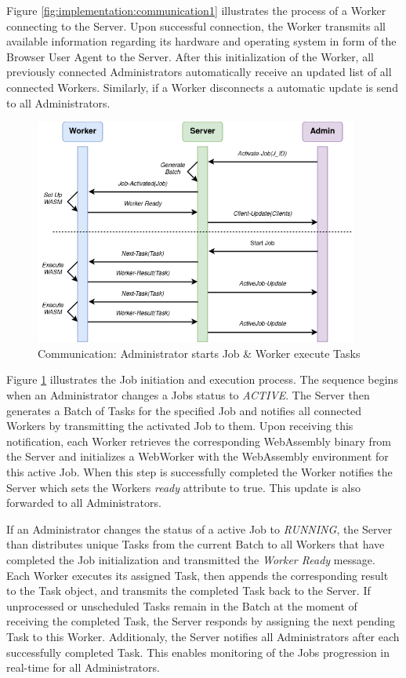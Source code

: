 Figure \ref{fig:implementation:communication1} illustrates the process of a Worker connecting to the Server. Upon successful connection, the Worker transmits all available information regarding its hardware and operating system in form of the Browser User Agent to the Server. After this initialization of the Worker, all previously connected Administrators automatically receive an updated list of all connected Workers. Similarly, if a Worker disconnects a automatic update is send to all Administrators.

\begin{figure}[htbp]
    \centering
    \includegraphics[width=0.95\textwidth]{gfx/figures/communication-jobexecution.png}
    \caption{Communication: Administrator starts Job \& Worker execute Tasks}
    \label{fig:implementation:communication2}
\end{figure}

Figure \ref{fig:implementation:communication2} illustrates the Job initiation and execution process. The sequence begins when an Administrator changes a Jobs status to \emph{ACTIVE}. The Server then generates a Batch of Tasks for the specified Job and notifies all connected Workers by transmitting the activated Job to them. Upon receiving this notification, each Worker retrieves the corresponding WebAssembly binary from the Server and initializes a WebWorker with the WebAssembly environment for this active Job. When this step is successfully completed the Worker notifies the Server which sets the Workers \emph{ready} attribute to true. This update is also forwarded to all Administrators.

If an Administrator changes the status of a active Job to \emph{RUNNING}, the Server than distributes unique Tasks from the current Batch to all Workers that have completed the Job initialization and transmitted the \emph{Worker Ready} message. Each Worker executes its assigned Task, then appends the corresponding result to the Task object, and transmits the completed Task back to the Server. If unprocessed or unscheduled Tasks remain in the Batch at the moment of receiving the completed Task, the Server responds by assigning the next pending Task to this Worker. Additionaly, the Server notifies all Administrators after each successfully completed Task. This enables monitoring of the Jobs progression in real-time for all Administrators.

